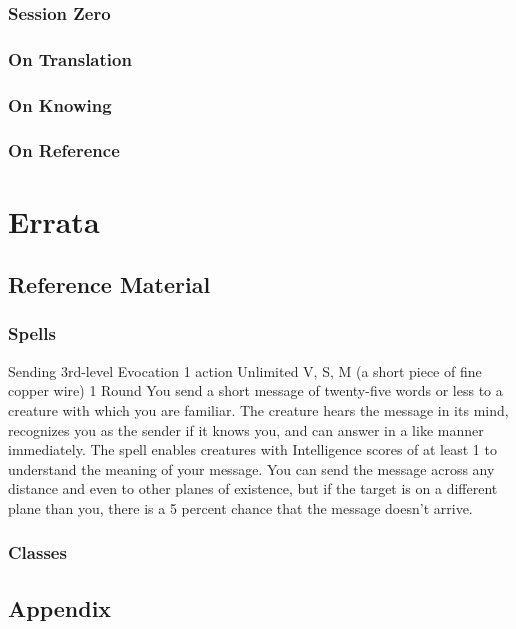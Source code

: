 \documentclass[10pt,twoside,twocolumn,openany,nomultitoc]{book}
\begin{document}
\section{Session Zero}
\section{On Translation}
    \lipsum[1]
\section{On Knowing}
    \lipsum[2]
\section{On Reference}
    \lipsum[3]
    
\part{Errata}
\chapter{Reference Material}

\section{Spells}
    \DndSpellHeader%
      {Sending}
      {3rd-level Evocation}
      {1 action}
      {Unlimited}
      {V, S, M (a short piece of fine copper wire)}
      {1 Round}
            You send a short message of twenty-five words or less to a creature with which you are familiar. The creature hears the message in its mind, recognizes you as the sender if it knows you, and can answer in a like manner immediately. The spell enables creatures with Intelligence scores of at least 1 to understand the meaning of your message.
            You can send the message across any distance and even to other planes of existence, but if the target is on a different plane than you, there is a 5 percent chance that the message doesn't arrive.
            
\section{Classes}

\chapter{Appendix}
\end{document}
